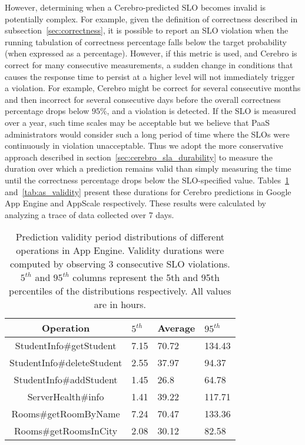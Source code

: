 However, determining when a Cerebro-predicted SLO becomes invalid is
potentially complex. For example, given the definition of correctness
described in subsection~\ref{sec:correctness}, it is possible to report an SLO violation
when the running tabulation of correctness percentage falls below the target
probability (when expressed as a percentage).  However, if this metric is
used, and Cerebro is correct for many consecutive measurements, a sudden
change in conditions that causes the response time to persist at a higher
level will not immediately trigger a violation.  For example, Cerebro might be
correct for several consecutive months and then incorrect for several
consecutive days before the overall correctness percentage drops below $95\%$,
and a violation is detected.  If the SLO is measured over a year, such time
scales may be acceptable but we believe that PaaS administrators would
consider such a long period of time where the SLOs were continuously in
violation unacceptable.
Thus we adopt the more conservative approach described in 
section~\ref{sec:cerebro_sla_durability} to measure the duration over
which a prediction remains valid than simply measuring the time until the
correctness percentage drops below the SLO-specified value.
Tables~\ref{tab:gae_validity} and~\ref{tab:as_validity} present these durations
for Cerebro predictions in Google App Engine and AppScale
respectively. These results were calculated by analyzing a trace of
data collected over 7 days.

\begin{table}
\caption{Prediction validity period distributions of different operations in
App Engine. Validity durations were computed by observing $3$ consecutive SLO
violations. $5^{th}$ and $95^{th}$ columns represent the 5th and 95th 
percentiles of the
distributions respectively. All values are in hours.
\label{tab:gae_validity}
}
\begin{center}
\begin{tabular}{|c|p{2cm}|p{2cm}|p{2cm}|}
\hline
Operation & $5^{th}$ & Average & $95^{th}$ \\ \hline
StudentInfo\#getStudent & 7.15 & 70.72 & 134.43 \\ \hline
StudentInfo\#deleteStudent & 2.55 & 37.97 & 94.37 \\ \hline
StudentInfo\#addStudent & 1.45 & 26.8 & 64.78 \\ \hline
ServerHealth\#info & 1.41 & 39.22 & 117.71 \\ \hline
Rooms\#getRoomByName & 7.24 & 70.47 & 133.36 \\ \hline
Rooms\#getRoomsInCity & 2.08 & 30.12 & 82.58 \\ \hline
\end{tabular}
\end{center}
\vspace{-0.1in}
\end{table}

